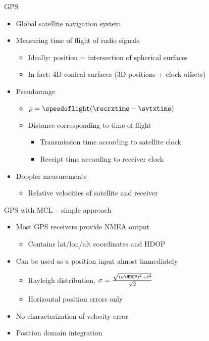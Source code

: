 \documentclass[utf8]{beamer}
\begin{document}
\begin{frame}{GPS}
    \begin{itemize}
        \item Global satellite navigation system
        \item Measuring time of flight of radio signals
        \begin{itemize}
            \item Ideally: position = intersection of spherical surfaces
            \item In fact: 4D conical surfaces (3D positions + clock offsets)
        \end{itemize}
        \item Pseudorange
        \begin{itemize}
            \item \(\rho = \speedoflight (\recrxtime - \svtxtime)\)
            \item Distance corresponding to time of flight
            \begin{itemize}
                \item Transmission time according to satellite clock
                \item Receipt time according to receiver clock
            \end{itemize}
        \end{itemize}
        \item Doppler measurements
        \begin{itemize}
            \item Relative velocities of satellite and receiver
        \end{itemize}
    \end{itemize}
\end{frame}

\begin{frame}{GPS with MCL -- simple approach}
    \begin{itemize}
        \item Most GPS receivers provide NMEA output
        \begin{itemize}
            \item Contains lat/lon/alt coordinates and HDOP
        \end{itemize}
        \item Can be used as a position input almost immediately
        \begin{itemize}
            \item Rayleigh distribution, \( \sigma = \frac{\sqrt{(a \HDOP)^2 + b^2}}{\sqrt{2}} \)
            \item Horizontal position errors only
        \end{itemize}
        \item No characterization of velocity error
        \item Position domain integration
    \end{itemize}
\end{frame}
\end{document}
